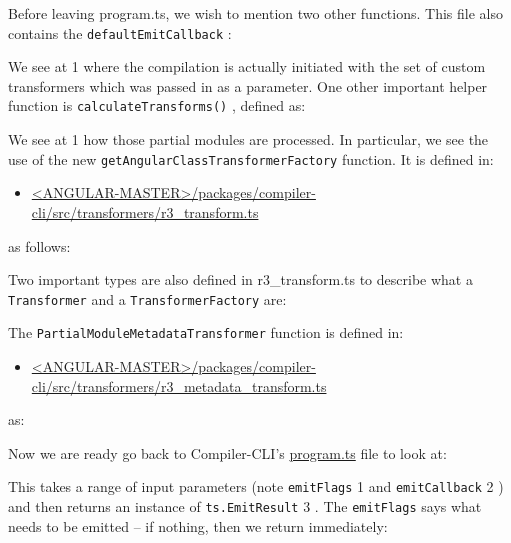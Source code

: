 Before leaving program.ts, we wish to mention two other functions. This file also
contains the
\texttt{defaultEmitCallback}
:



We see at
1
where the compilation is actually initiated with the set of custom
transformers which was passed in as a parameter.
One other important helper function is
\texttt{calculateTransforms()}
, defined as:



We see at
1
how those partial modules are processed. In particular, we see the use of
the new
\texttt{getAngularClassTransformerFactory}
function. It is defined in:

\begin{itemize}
  \item \href{https://github.com/angular/angular/blob/c8a1a14b87e5907458e8e87021e47f9796cb3257/packages/compiler-cli/src/transformers/r3_transform.ts}
        {<ANGULAR-MASTER>/packages/compiler-cli/src/transformers/r3\_transform.ts}
\end{itemize}

as follows:



Two important types are also defined in r3\_transform.ts to describe what a
\texttt{Transformer}
and a
\texttt{TransformerFactory}
are:



The
\texttt{PartialModuleMetadataTransformer}
function is defined in:

\begin{itemize}
  \item \href{https://github.com/angular/angular/blob/master/packages/compiler-cli/src/transformers/r3_metadata_transform.ts}
        {<ANGULAR-MASTER>/packages/compiler-cli/src/transformers/r3\_metadata\_transform.ts}
\end{itemize}

as:



Now we are ready go back to Compiler-CLI’s
\url{program.ts}
file to look at:



This takes a range of input parameters (note
\texttt{emitFlags}
1
and
\texttt{emitCallback}
2
) and
then returns an instance of
\texttt{ts.EmitResult}
3
. The
\texttt{emitFlags}
says what needs to be
emitted – if nothing, then we return immediately:

